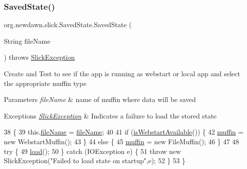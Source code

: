 \subsubsection{\texorpdfstring{Saved\+State()}{SavedState()}}
{\footnotesize\ttfamily org.\+newdawn.\+slick.\+Saved\+State.\+Saved\+State (\begin{DoxyParamCaption}\item[{String}]{file\+Name }\end{DoxyParamCaption}) throws \mbox{\hyperlink{classorg_1_1newdawn_1_1slick_1_1_slick_exception}{Slick\+Exception}}\hspace{0.3cm}{\ttfamily [inline]}}

Create and Test to see if the app is running as webstart or local app and select the appropriate muffin type


\begin{DoxyParams}{Parameters}
{\em file\+Name} & name of muffin where data will be saved \\
\hline
\end{DoxyParams}

\begin{DoxyExceptions}{Exceptions}
{\em \mbox{\hyperlink{classorg_1_1newdawn_1_1slick_1_1_slick_exception}{Slick\+Exception}}} & Indicates a failure to load the stored state \\
\hline
\end{DoxyExceptions}

\begin{DoxyCode}
38                                                              \{
39         this.\mbox{\hyperlink{classorg_1_1newdawn_1_1slick_1_1_saved_state_ace5c7436bfdba5164f2b1826bb173388}{fileName}} = \mbox{\hyperlink{classorg_1_1newdawn_1_1slick_1_1_saved_state_ace5c7436bfdba5164f2b1826bb173388}{fileName}};
40         
41         \textcolor{keywordflow}{if} (\mbox{\hyperlink{classorg_1_1newdawn_1_1slick_1_1_saved_state_a2073d608e7e841ae5ff8eef63f596cf2}{isWebstartAvailable}}()) \{
42             \mbox{\hyperlink{classorg_1_1newdawn_1_1slick_1_1_saved_state_a461d13c1acfff7fbc631724ff5fae6a1}{muffin}} = \textcolor{keyword}{new} WebstartMuffin();
43         \}
44         \textcolor{keywordflow}{else} \{
45             \mbox{\hyperlink{classorg_1_1newdawn_1_1slick_1_1_saved_state_a461d13c1acfff7fbc631724ff5fae6a1}{muffin}} = \textcolor{keyword}{new} FileMuffin();
46         \}
47         
48         \textcolor{keywordflow}{try} \{
49             \mbox{\hyperlink{classorg_1_1newdawn_1_1slick_1_1_saved_state_a40cf0eea8c044407bfdee0e801887ed8}{load}}();
50         \} \textcolor{keywordflow}{catch} (IOException e) \{
51             \textcolor{keywordflow}{throw} \textcolor{keyword}{new} SlickException(\textcolor{stringliteral}{"Failed to load state on startup"},e);
52         \}
53     \}   
\end{DoxyCode}


